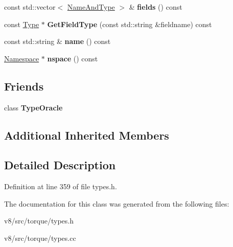 \begin{DoxyCompactItemize}
const std\+::vector$<$ \mbox{\hyperlink{structv8_1_1internal_1_1torque_1_1NameAndType}{Name\+And\+Type}} $>$ \& {\bfseries fields} () const
\item 
\mbox{\label{classv8_1_1internal_1_1torque_1_1StructType_a6bd5a62a8dff09177bc96228e95d694c}} 
const \mbox{\hyperlink{classv8_1_1internal_1_1torque_1_1Type}{Type}} $\ast$ {\bfseries Get\+Field\+Type} (const std\+::string \&fieldname) const
\item 
\mbox{\label{classv8_1_1internal_1_1torque_1_1StructType_a72fd71b5a82411332307ecdb3699fb6e}} 
const std\+::string \& {\bfseries name} () const
\item 
\mbox{\label{classv8_1_1internal_1_1torque_1_1StructType_ad38ebb5d1ffbf613c1a60c8ae1194ba6}} 
\mbox{\hyperlink{classv8_1_1internal_1_1torque_1_1Namespace}{Namespace}} $\ast$ {\bfseries nspace} () const
\end{DoxyCompactItemize}
\subsection*{Friends}
\begin{DoxyCompactItemize}
\item 
\mbox{\label{classv8_1_1internal_1_1torque_1_1StructType_a7094142f1d9b95b74797a11decbf23e3}} 
class {\bfseries Type\+Oracle}
\end{DoxyCompactItemize}
\subsection*{Additional Inherited Members}


\subsection{Detailed Description}


Definition at line 359 of file types.\+h.



The documentation for this class was generated from the following files\+:\begin{DoxyCompactItemize}
\item 
v8/src/torque/types.\+h\item 
v8/src/torque/types.\+cc\end{DoxyCompactItemize}
